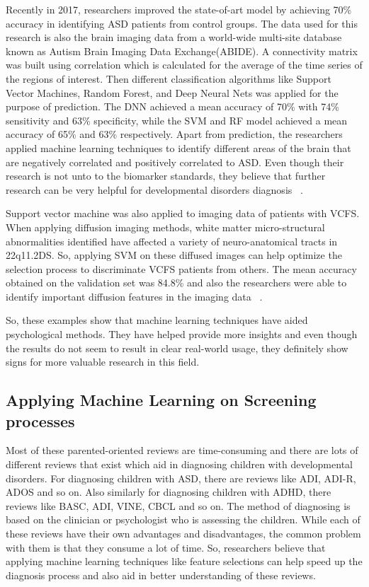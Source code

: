 Recently in 2017, researchers improved the state-of-art model by achieving 70\% accuracy in identifying ASD patients from control groups. The data used for this research is also the brain imaging data from a world-wide multi-site database known as Autism Brain Imaging Data Exchange(ABIDE). A connectivity matrix was built using correlation which is calculated for the average of the time series of the regions of interest. Then different classification algorithms like Support Vector Machines, Random Forest, and Deep Neural Nets was applied for the purpose of prediction. The DNN achieved a mean accuracy of 70\% with 74\% sensitivity and 63\% specificity, while the SVM and RF model achieved a mean accuracy of 65\% and 63\% respectively. Apart from prediction, the researchers applied machine learning techniques to identify different areas of the brain that are negatively correlated and positively correlated to ASD. Even though their research is not unto to the biomarker standards, they believe that further research can be very helpful for developmental disorders diagnosis ~\cite{heinsfeld2018identification}.

Support vector machine was also applied to imaging data of patients with VCFS. When applying diffusion imaging methods, white matter micro-structural abnormalities identified have affected a variety of neuro-anatomical tracts in 22q11.2DS. So, applying SVM on these diffused images can help optimize the selection process to discriminate VCFS patients from others. The mean accuracy obtained on the validation set was 84.8\% and also the researchers were able to identify important diffusion features in the imaging data ~\cite{tylee2017machine}.

So, these examples show that machine learning techniques have aided psychological methods. They have helped provide more insights and even though the results do not seem to result in clear real-world usage, they definitely show signs for more valuable research in this field.

\subsection{Applying Machine Learning on Screening processes}
Most of these parented-oriented reviews are time-consuming and there are lots of different reviews that exist which aid in diagnosing children with developmental disorders. For diagnosing children with ASD, there are reviews like ADI, ADI-R, ADOS and so on. Also similarly for diagnosing children with ADHD, there reviews like BASC, ADI, VINE, CBCL and so on. The method of diagnosing is based on the clinician or psychologist who is assessing the children. While each of these reviews have their own advantages and disadvantages, the common problem with them is that they consume a lot of time. So, researchers believe that applying machine learning techniques like feature selections can help speed up the diagnosis process and also aid in better understanding of these reviews.

